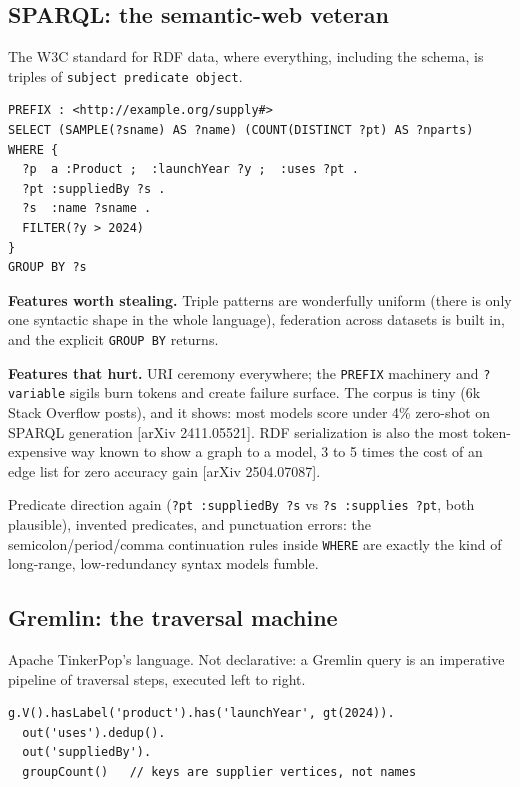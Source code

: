 \documentclass[11pt]{article}
\begin{document}
\subsection{SPARQL: the semantic-web veteran}

The W3C standard for RDF data, where everything, including the schema, is triples of \texttt{subject predicate object}.

\begin{lstlisting}[style=old,morekeywords={SELECT,WHERE,GROUP,BY,COUNT,DISTINCT,AS,FILTER,PREFIX,a}]
PREFIX : <http://example.org/supply#>
SELECT (SAMPLE(?sname) AS ?name) (COUNT(DISTINCT ?pt) AS ?nparts)
WHERE {
  ?p  a :Product ;  :launchYear ?y ;  :uses ?pt .
  ?pt :suppliedBy ?s .
  ?s  :name ?sname .
  FILTER(?y > 2024)
}
GROUP BY ?s
\end{lstlisting}

\textbf{Features worth stealing.} Triple patterns are wonderfully uniform (there is only one syntactic shape in the whole language), federation across datasets is built in, and the explicit \texttt{GROUP BY} returns.

\textbf{Features that hurt.} URI ceremony everywhere; the \texttt{PREFIX} machinery and \texttt{?variable} sigils burn tokens and create failure surface. The corpus is tiny (6k Stack Overflow posts), and it shows: most models score under 4\% zero-shot on SPARQL generation [arXiv 2411.05521]. RDF serialization is also the most token-expensive way known to show a graph to a model, 3 to 5 times the cost of an edge list for zero accuracy gain [arXiv 2504.07087].

\begin{failbox}
Predicate direction again (\texttt{?pt :suppliedBy ?s} vs \texttt{?s :supplies ?pt}, both plausible), invented predicates, and punctuation errors: the semicolon/period/comma continuation rules inside \texttt{WHERE} are exactly the kind of long-range, low-redundancy syntax models fumble.
\end{failbox}

\subsection{Gremlin: the traversal machine}

Apache TinkerPop's language. Not declarative: a Gremlin query is an imperative pipeline of traversal steps, executed left to right.

\begin{lstlisting}[style=old,morekeywords={hasLabel,has,out,in,gt,groupCount,by,values,g,V,unfold,dedup,select,name}]
g.V().hasLabel('product').has('launchYear', gt(2024)).
  out('uses').dedup().
  out('suppliedBy').
  groupCount()   // keys are supplier vertices, not names
\end{lstlisting}
\end{document}
